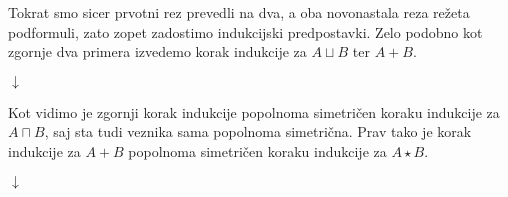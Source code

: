 \begin{prooftree}

\end{prooftree}
Tokrat smo sicer prvotni rez prevedli na dva, a oba novonastala reza režeta podformuli, zato zopet zadostimo indukcijski predpostavki. Zelo podobno kot zgornje dva primera izvedemo korak indukcije za $A \sqcup B$ ter $A+B$.
\begin{prooftree}


\end{prooftree}
\begin{center}
    $\downarrow$
\end{center}
\begin{prooftree}
\end{prooftree}
Kot vidimo je zgornji korak indukcije popolnoma simetričen koraku indukcije za $A \sqcap B$, saj sta tudi veznika sama popolnoma simetrična. Prav tako je korak indukcije za $A+B$ popolnoma simetričen koraku indukcije za $A \star B$.
\begin{prooftree}


\end{prooftree}
\begin{center}
    $\downarrow$
\end{center}
